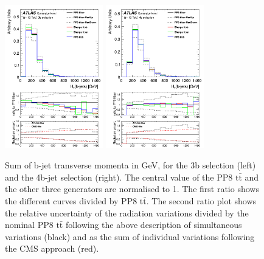 \begin{figure}[!htb]
\centering
\includegraphics[width=0.38\textwidth]{Plots/ttbb/hisgenHTbjets_4j3t__div}
\includegraphics[width=0.38\textwidth]{Plots/ttbb/hisgenHTbjets_4j4t__div}
  \caption{Sum of b-jet transverse momenta in GeV, for the 3b selection (left) and the 4b-jet selection (right). The central value of the PP8 $\mathrm{t\bar{t}}$ and the other three generators are normalised to 1. The first ratio shows the different curves divided by PP8 $\mathrm{t\bar{t}}$. The second ratio plot shows the relative uncertainty of the radiation variations divided by the nominal PP8 $\mathrm{t\bar{t}}$ following the above description of simultaneous variations (black) and as the sum of individual variations following the CMS approach (red). \label{ttbb:HTbjets}}
\end{figure}

